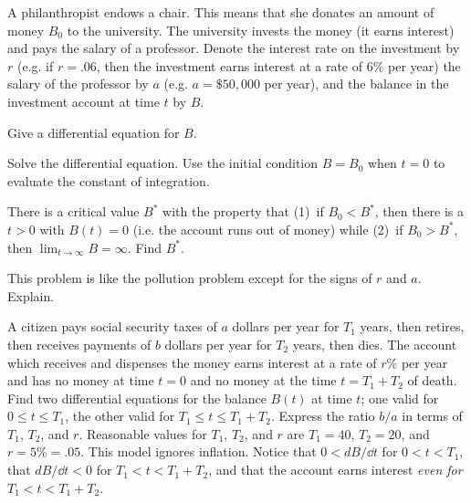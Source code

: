 \begin{multicols}{2}
\problem \groupproblem A philanthropist endows a chair. This means that she %
donates an amount of money $B_0$ to the university.  The university invests
the money (it earns interest) and pays the salary of a professor.  Denote
the interest rate on the investment by $r$ (e.g. if $r=.06$, then the
investment earns interest at a rate of $6\%$ per year) the salary of the
professor by $a$ (e.g. $a=\$50,000$ per year), and the balance in the
investment account at time $t$ by $B$.

\subprob Give a differential equation for $B$.

\subprob Solve the differential equation. Use the initial condition $B=B_0$
when $t=0$ to evaluate the constant of integration.

\subprob There is a critical value $B^*$ with the property that (1)~if
$B_0<B^*$, then there is a $t>0$ with $B(t)=0$ (i.e. the account runs out
of money) while (2)~if $B_0>B^*$, then $\lim_{t\to\infty}B=\infty$.  Find
$B^*$.

\subprob This problem is like the pollution problem except for the signs of
$r$ and $a$. Explain.

\problem \groupproblem A citizen pays social security taxes of $a$ dollars %
per year for $T_1$ years, then retires, then receives payments of $b$
dollars per year for $T_2$ years, then dies. The account which receives and
dispenses the money earns interest at a rate of $r$\% per year and has no
money at time $t=0$ and no money at the time $t=T_1+T_2$ of death.  Find
two differential equations for the balance $B(t)$ at time $t$; one valid
for $0\le t\le T_1$, the other valid for $T_1\le t\le T_1+T_2$.  Express
the ratio $b/a$ in terms of $T_1$, $T_2$, and $r$.  Reasonable values for
$T_1$, $T_2$, and $r$ are $T_1=40$, $T_2=20$, and $r=5\%=.05$. This model
ignores inflation. Notice that $0<dB/\dd t$ for $0<t<T_1$, that $dB/\dd
t<0$ for $T_1<t<T_1+T_2$, and that the account earns interest {\em even for
} $T_1<t<T_1+T_2$.


\end{multicols}
\noproblemfont


